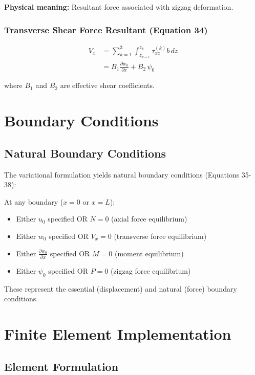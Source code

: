 \documentclass[12pt,a4paper]{article}
\begin{document}
\textbf{Physical meaning:} Resultant force associated with zigzag deformation.

\subsubsection{Transverse Shear Force Resultant (Equation 34)}

\begin{align}
V_x &= \sum_{k=1}^{3} \int_{z_{k-1}}^{z_k} \tau_{xz}^{(k)} b \, dz \nonumber \\
    &= B_{1} \frac{\partial w_0}{\partial x} + B_{2} \, \psi_0
\end{align}

where $B_1$ and $B_2$ are effective shear coefficients.

\section{Boundary Conditions}

\subsection{Natural Boundary Conditions}

The variational formulation yields natural boundary conditions (Equations 35-38):

At any boundary ($x = 0$ or $x = L$):
\begin{itemize}
\item Either $u_0$ specified OR $N = 0$ (axial force equilibrium)
\item Either $w_0$ specified OR $V_x = 0$ (transverse force equilibrium)
\item Either $\frac{\partial w_0}{\partial x}$ specified OR $M = 0$ (moment equilibrium)
\item Either $\psi_0$ specified OR $P = 0$ (zigzag force equilibrium)
\end{itemize}

These represent the essential (displacement) and natural (force) boundary conditions.

\section{Finite Element Implementation}

\subsection{Element Formulation}
\end{document}
